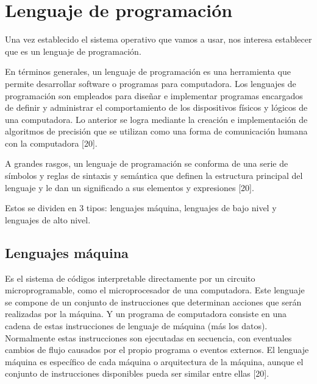 
\section{Lenguaje de programación}

Una vez establecido el sistema operativo que vamos a usar, nos interesa establecer que es un lenguaje de programación.
\begin{list}{}%
    {\setlength{\leftmargin}{1cm}\setlength{\rightmargin}{1cm}}
    \item\relax
    \small
En términos generales, un lenguaje de programación es una herramienta que permite desarrollar software o programas para computadora. Los lenguajes de programación son empleados para diseñar e implementar programas encargados de definir y administrar el comportamiento de los dispositivos físicos y lógicos de una computadora. Lo anterior se logra mediante la creación e implementación de algoritmos de precisión que se utilizan como una forma de comunicación humana con la computadora [20].

A grandes rasgos, un lenguaje de programación se conforma de una serie de símbolos y reglas de sintaxis y semántica que definen la estructura principal del lenguaje y le dan un significado a sus elementos y expresiones [20].
\end{list}
Estos se dividen en 3 tipos: lenguajes máquina, lenguajes de bajo nivel y lenguajes de alto nivel.


\subsection{Lenguajes máquina}

\begin{list}{}%
    {\setlength{\leftmargin}{1cm}\setlength{\rightmargin}{1cm}}
    \item\relax
    \small

Es el sistema de códigos interpretable directamente por un circuito microprogramable, como el microprocesador de una computadora. Este lenguaje se compone de un conjunto de instrucciones que determinan acciones que serán realizadas por la máquina. Y un programa de computadora consiste en una cadena de estas instrucciones de lenguaje de máquina (más los datos). Normalmente estas instrucciones son ejecutadas en secuencia, con eventuales cambios de flujo causados por el propio programa o eventos externos. El lenguaje máquina es específico de cada máquina o arquitectura de la máquina, aunque el conjunto de instrucciones disponibles pueda ser similar entre ellas [20].

\end{list}

